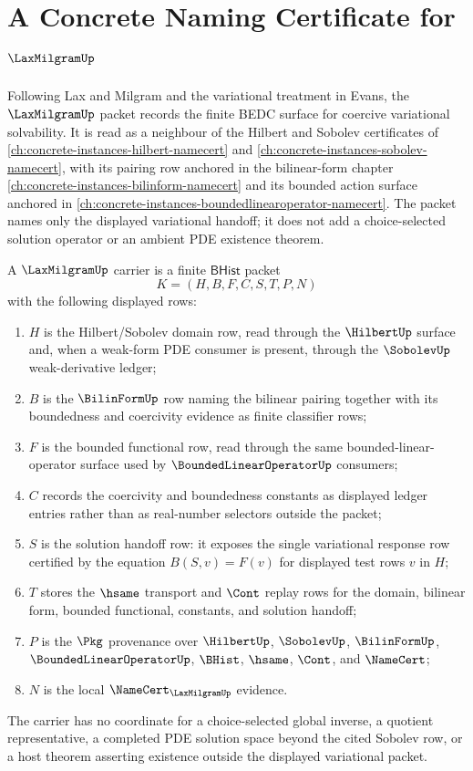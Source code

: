 \chapter{A Concrete Naming Certificate for $\LaxMilgramUp$}
\label{ch:concrete-instances-lax-milgram-namecert}

Following Lax and Milgram and the variational treatment in Evans, the $\LaxMilgramUp$ packet records the finite BEDC surface for coercive variational solvability. It is read as a neighbour of the Hilbert and Sobolev certificates of \autoref{ch:concrete-instances-hilbert-namecert} and \autoref{ch:concrete-instances-sobolev-namecert}, with its pairing row anchored in the bilinear-form chapter \autoref{ch:concrete-instances-bilinform-namecert} and its bounded action surface anchored in \autoref{ch:concrete-instances-boundedlinearoperator-namecert}. The packet names only the displayed variational handoff; it does not add a choice-selected solution operator or an ambient PDE existence theorem.

\begin{definition}
\label{def:lax-milgram-carrier}
A $\LaxMilgramUp$ carrier is a finite $\mathsf{BHist}$ packet
$$
K=(H,B,F,C,S,T,P,N)
$$
with the following displayed rows:
\begin{enumerate}
\item $H$ is the Hilbert/Sobolev domain row, read through the $\HilbertUp$ surface and, when a weak-form PDE consumer is present, through the $\SobolevUp$ weak-derivative ledger;
\item $B$ is the $\BilinFormUp$ row naming the bilinear pairing together with its boundedness and coercivity evidence as finite classifier rows;
\item $F$ is the bounded functional row, read through the same bounded-linear-operator surface used by $\BoundedLinearOperatorUp$ consumers;
\item $C$ records the coercivity and boundedness constants as displayed ledger entries rather than as real-number selectors outside the packet;
\item $S$ is the solution handoff row: it exposes the single variational response row certified by the equation $B(S,v)=F(v)$ for displayed test rows $v$ in $H$;
\item $T$ stores the $\hsame$ transport and $\Cont$ replay rows for the domain, bilinear form, bounded functional, constants, and solution handoff;
\item $P$ is the $\Pkg$ provenance over $\HilbertUp$, $\SobolevUp$, $\BilinFormUp$, $\BoundedLinearOperatorUp$, $\BHist$, $\hsame$, $\Cont$, and $\NameCert$;
\item $N$ is the local $\NameCert_{\LaxMilgramUp}$ evidence.
\end{enumerate}
The carrier has no coordinate for a choice-selected global inverse, a quotient representative, a completed PDE solution space beyond the cited Sobolev row, or a host theorem asserting existence outside the displayed variational packet.
\end{definition}

